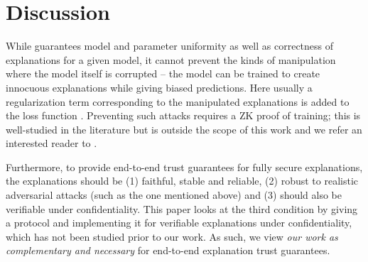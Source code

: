 \section{Discussion}\label{sec:discuss}
While \name guarantees model and parameter uniformity as well as correctness of explanations for a given model, it cannot prevent the kinds of manipulation where the model itself is corrupted -- the model can be trained to create innocuous explanations while giving biased predictions. Here usually a regularization term corresponding to the manipulated explanations is added to the loss function \cite{aivodji2019fairwashing, yadav2024influence}. Preventing such attacks requires a ZK proof of training; this is well-studied in the literature but is outside the scope of this work and we refer an interested reader to \cite{garg2023experimenting}.

Furthermore, to provide end-to-end trust guarantees for fully secure explanations, the explanations should be (1) faithful, stable and reliable, (2) robust to realistic adversarial attacks (such as the one mentioned above) and (3) should also be verifiable under confidentiality. This paper looks at the third condition by giving a protocol \name and implementing it for verifiable explanations under confidentiality, which has not been studied prior to our work. As such, we view \textit{our work as complementary and necessary} for end-to-end explanation trust guarantees.



